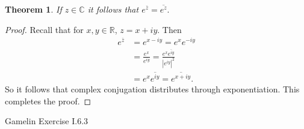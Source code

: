 \documentclass[letter]{article}
\newtheorem{theorem}{Theorem}
\newenvironment{menumerate}{%
  \edef\backupindent{\the\parindent}%
  \enumerate%
  \setlength{\parindent}{\backupindent}%
}{\endenumerate}
\begin{document}
\begin{menumerate}
\begin{theorem}
        If $z \in \mathbb{C}$ it follows that $e^{\overline{z}} = \overline{e^z}.$
    \end{theorem}
    \begin{proof}
        Recall that for $x,y \in \mathbb{R}$, $z = x + iy.$ Then
        \begin{equation}
            \begin{aligned}
                e^{\overline{z}} &= e^{x - iy} = e^{x}e^{-iy} \\
                &= \frac{e^{x}}{e^{iy}} = \frac{e^x\overline{e^{iy}}}{|e^{iy}|^2} \\
                &= e^x\overline{e^{iy}} = \overline{e^{x+iy}}.
            \end{aligned}
        \end{equation}
        So it follows that complex conjugation distributes through exponentiation. This completes the proof.
    \end{proof}
    \item Gamelin Exercise I.6.3
    
\end{menumerate}
\end{document}
